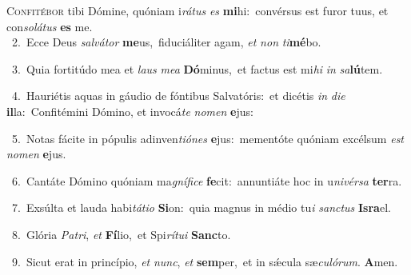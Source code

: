 \lettrine{\initial\textcolor{\initialcolor}{C}}{onfitébor} tibi Dómine, quóniam i\-\textit{rá}\-\textit{tus} \textit{es} \textbf{mi}\-hi:~\star convérsus est furor tuus, et con\-\textit{so}\-\textit{lá}\textit{tus} \textbf{es} me.\\
{\numbfont\textcolor{\numbcolor}{~2.}}~Ecce Deus \textit{sal}\-\textit{vá}\textit{tor} \textbf{me}\-us,~\star fiduciáliter agam, \textit{et} \textit{non} \textit{ti}\-\textbf{mé}bo.\par
{\numbfont\textcolor{\numbcolor}{~3.}}~Quia fortitúdo mea et \textit{laus} \textit{me}\-\textit{a} \textbf{Dó}\-minus,~\star et factus est mi\textit{hi} \textit{in} \textit{sa}\-\textbf{lú}tem.\par
{\numbfont\textcolor{\numbcolor}{~4.}}~Hauriétis aquas in gáudio de fóntibus Salvatóris:~\dagger et dicétis \textit{in} \textit{di}\-\textit{e} \textbf{il}\-la:~\star Confitémini Dómino, et invocá\textit{te} \textit{no}\-\textit{men} \textbf{e}\-jus:\par
{\numbfont\textcolor{\numbcolor}{~5.}}~Notas fácite in pópulis adinven\-\textit{ti}\-\textit{ó}\textit{nes} \textbf{e}\-jus:~\star mementóte quóniam excélsum \textit{est} \textit{no}\-\textit{men} \textbf{e}\-jus.\par
{\numbfont\textcolor{\numbcolor}{~6.}}~Cantáte Dómino quóniam ma\-\textit{gní}\-\textit{fi}\textit{ce} \textbf{fe}\-cit:~\star annuntiáte hoc in u\-\textit{ni}\-\textit{vér}\textit{sa} \textbf{ter}\-ra.\par
{\numbfont\textcolor{\numbcolor}{~7.}}~Exsúlta et lauda habi\-\textit{tá}\-\textit{ti}\textit{o} \textbf{Si}\-on:~\star quia magnus in médio tu\textit{i} \textit{sanc}\-\textit{tus} \textbf{Is}\-\textbf{ra}el.\par
{\numbfont\textcolor{\numbcolor}{~8.}}~Glória \textit{Pa}\-\textit{tri}, \textit{et} \textbf{Fí}\-lio,~\star et Spi\-\textit{rí}\-\textit{tu}\textit{i} \textbf{Sanc}\-to.\par
{\numbfont\textcolor{\numbcolor}{~9.}}~Sicut erat in princípio, \textit{et} \textit{nunc}\-, \textit{et} \textbf{sem}\-per,~\star et in sǽcula sæ\-\textit{cu}\-\textit{ló}\textit{rum}. \textbf{A}\-men.\par
